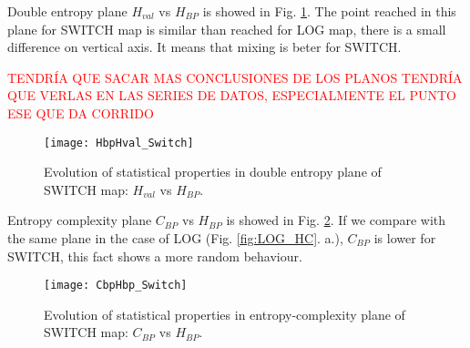 Double entropy plane $H_{val}$ vs $H_{BP}$ is showed in Fig. \ref{fig:SWITCH_HH}.
The point reached in this plane for SWITCH map is similar than reached for LOG map, there is a small difference on vertical axis.
It means that mixing is beter for SWITCH.

\textcolor{red}{TENDRÍA QUE SACAR MAS CONCLUSIONES DE LOS PLANOS TENDRÍA QUE VERLAS EN LAS SERIES DE DATOS, ESPECIALMENTE EL PUNTO ESE QUE DA CORRIDO}

\begin{figure}
	\texttt{[image: HbpHval\_Switch]}
	\caption{Evolution of statistical properties in double entropy plane of SWITCH map: $H_{val}$ vs $H_{BP}$.}
	\label{fig:SWITCH_HH}
\end{figure}

Entropy complexity plane $C_{BP}$ vs $H_{BP}$ is showed in Fig. \ref{fig:SWITCH_HC}.
If we compare with the same plane in the case of LOG (Fig. \ref{fig:LOG_HC}. a.), $C_{BP}$ is lower for SWITCH, this fact shows a more random behaviour.

\begin{figure}
	\texttt{[image: CbpHbp\_Switch]}
	\caption{Evolution of statistical properties in entropy-complexity plane of SWITCH map: $C_{BP}$ vs $H_{BP}$.}
	\label{fig:SWITCH_HC}
\end{figure}